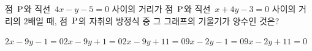 점~$\mathrm{P}$와 직선~$4x-y-5=0$ 사이의 거리가 점~$\mathrm{P}$와 직선~$x+4y-3=0$ 사이의 거리의 $2$배일 때, 점~$\mathrm{P}$의 자취의 방정식 중 그 그래프의 기울기가 양수인 것은?
\begin{choicesii}{$2x-9y-1=0$}{$2x-9y+1=0$}{$2x-9y+11=0$}{$9x-2y-1=0$}{$9x-2y+11=0$}\end{choicesii}

